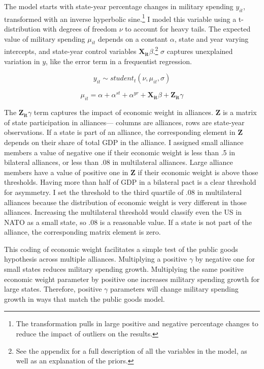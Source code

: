 \documentclass[12pt]{article}
\begin{document}
The model starts with state-year percentage changes in military spending $y_{it}$, transformed with an inverse hyperbolic sine.\footnote{The transformation pulls in large positive and negative percentage changes to reduce the impact of outliers on the results.} 
I model this variable using a t-distribution with degrees of freedom $\nu$ to account for heavy tails.
The expected value of military spending $\mu_{it}$ depends on a constant $\alpha$, state and year varying intercepts, and state-year control variables $\mathbf{X_{it}} \beta$.\footnote{See the appendix for a full description of all the variables in the model, as well as an explanation of the priors.} 
$\sigma$ captures unexplained variation in $y$, like the error term in a frequentist regression. 

\begin{equation}
y_{it} \sim student_t(\nu, \mu_{it}, \sigma) 
\end{equation}

\begin{equation}
\mu_{it} = \alpha + \alpha^{st} + \alpha^{yr} + \mathbf{X_{it}} \beta + \mathbf{Z_{it}} \gamma
\end{equation}


The $\mathbf{Z_{it}} \gamma$ term captures the impact of economic weight in alliances.  
$\textbf{Z}$ is a matrix of state participation in alliances--- columns are alliances, rows are state-year observations.  
If a state is part of an alliance, the corresponding element in $\textbf{Z}$ depends on their share of total GDP in the alliance. 
I assigned small alliance members a value of negative one if their economic weight is less than .5 in bilateral alliances, or less than .08 in multilateral alliances.
Large alliance members have a value of positive one in $\textbf{Z}$ if their economic weight is above those thresholds. 
Having more than half of GDP in a bilateral pact is a clear threshold for asymmetry. 
I set the threshold to the third quartile of .08 in multilateral alliances because the distribution of economic weight is very different in those alliances. 
Increasing the multilateral threshold would classify even the US in NATO as a small state, so .08 is a reasonable value. 
If a state is not part of the alliance, the corresponding matrix element is zero.

 
This coding of economic weight facilitates a simple test of the public goods hypothesis across multiple alliances. 
Multiplying a positive $\gamma$ by negative one for small states reduces military spending growth.
Multiplying the same positive economic weight parameter by positive one increases military spending growth for large states. 
Therefore, positive $\gamma$ parameters will change military spending growth in ways that match the public goods model. 
\end{document}
